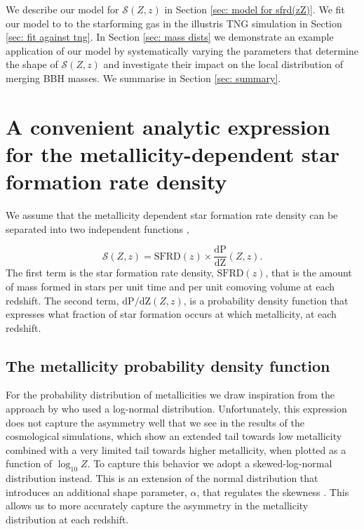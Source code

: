 \documentclass[twocolumn]{aastex631}
\newcommand{\SFRDzZ}{\ensuremath{\mathcal{S}(Z,z)}\xspace}
\newcommand{\SFRDz}{\ensuremath{\mathrm{SFRD}(z)}\xspace}
\newcommand{\dPdZ}{\ensuremath{\mathrm{\frac{dP}{dZ}}(Z,z)}\xspace}
\newcommand{\dpdZ}{\ensuremath{\mathrm{dP/dZ}(Z,z)}\xspace}
\begin{document}
We describe our model for \SFRDzZ in Section \ref{sec: model for sfrd(zZ)}.
We fit our model to to the starforming gas in the illustris TNG simulation in Section \ref{sec: fit against tng}. In Section \ref{sec: mass dists} we demonstrate an example application of our model by systematically varying the parameters that determine the shape of \SFRDzZ and investigate their impact on the local distribution of merging BBH masses.
We summarise in Section \ref{sec: summary}.

\section{A convenient analytic expression for the metallicity-dependent star formation rate density \label{sec: model for sfrd(zZ)} }
We assume that the metallicity dependent star formation rate density can be separated into two independent functions \citep[e.g.\ ][]{Langer2006},

\begin{equation}
\label{eq: SFRD1}
    \SFRDzZ = \SFRDz \times \dPdZ.
\end{equation}
The first term is the star formation rate density, \SFRDz, that is the amount of mass formed in stars per unit time and per unit comoving volume at each redshift. The second term, \dpdZ, is a probability density function that expresses what fraction of star formation occurs at which metallicity, at each redshift. 
 

\subsection{The metallicity probability density function}
For the probability distribution of metallicities we draw inspiration from the approach by \citep[e.g.\ ][]{Neijssel+2019} who used a log-normal distribution. Unfortunately, this expression does not capture the asymmetry well that we see in the results of the cosmological simulations, which show an extended tail towards low metallicity combined with a very limited tail towards higher metallicity, when plotted as a function of $\log_10 Z$. To capture this behavior we adopt a skewed-log-normal distribution instead. This is an extension of the normal distribution that introduces an additional shape parameter, $\alpha$, that regulates the skewness \citep{Ohagan+1976}. This allows us to more accurately capture the asymmetry in the metallicity distribution at each redshift.
\end{document}
